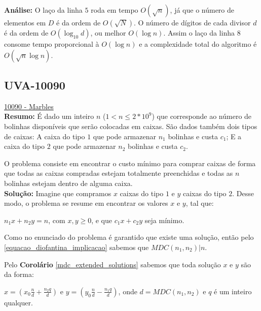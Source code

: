 \textbf{Análise:}
O laço da linha $5$ roda em tempo $O(\sqrt{n})$, já que o número de elementos em $D$ é da ordem de $O(\sqrt{N})$. O número de dígitos de cada divisor $d$ é da ordem de 
$O(\log_{10}d)$, ou melhor $O(\log n)$. Assim o laço da linha $8$ consome tempo proporcional à $O(\log n)$ e a complexidade total do algoritmo é $O(\sqrt n\log n)$. 



\subsection{UVA-10090}
\href{https://uva.onlinejudge.org/index.php?option=onlinejudge&page=show_problem&problem=1031}{10090 - Marbles}\\


\textbf{Resumo:}
É dado um inteiro $n$ ($1 < n \leq 2*10^9$) que corresponde ao número de bolinhas disponíveis que serão colocadas em caixas. São dados também dois tipos de caixas:
A caixa do tipo $1$ que pode armazenar $n_1$ bolinhas e custa $c_1$; E a caixa do tipo $2$ que pode armazenar $n_2$ bolinhas e custa $c_2$.

O problema consiste em encontrar o custo mínimo para comprar caixas de forma que todas as caixas compradas estejam totalmente
 preenchidas e todas as $n$ bolinhas estejam dentro de alguma caixa.
\\

\textbf{Solução:}
Imagine que compramos $x$ caixas do tipo $1$ e $y$ caixas do tipo $2$. Desse modo, o problema se resume em encontrar os valores $x$ e $y$, tal que: 
\newline

$n_1x + n_2y = n$, com $x,y\geq 0$, e que $c_1x+c_2y$ seja mínimo.
\newline 

Como no enunciado do problema é garantido que existe uma solução, então pelo \autoref{equacao_diofantina_implicacao} sabemos que $MDC(n_1,n_2) | n$.

Pelo \textbf{Corolário} \autoref{mdc_extended_solutions} sabemos que toda solução $x$ e $y$ são da forma:

$x=(x_0\frac{n}{d} + \frac{n_2q}{d})$ e $y =(y_0\frac{n}{d} - \frac{n_1q}{d})$, onde $d = MDC(n_1,n_2)$ e $q$ é um inteiro qualquer.

